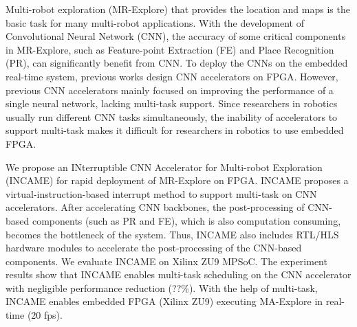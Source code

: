 Multi-robot exploration (MR-Explore) that provides the location and maps is the basic task for many multi-robot applications. 
With the development of Convolutional Neural Network (CNN), the accuracy of some critical components in MR-Explore, such as Feature-point Extraction (FE) and Place Recognition (PR), can significantly benefit from CNN. 
To deploy the CNNs on the embedded real-time system, previous works design CNN accelerators on FPGA. 
However, previous CNN accelerators mainly focused on improving the performance of a single neural network, lacking multi-task support.
Since researchers in robotics usually run different CNN tasks simultaneously, the inability of accelerators to support multi-task makes it difficult for researchers in robotics to use embedded FPGA.

We propose an INterruptible CNN Accelerator for Multi-robot Exploration (INCAME) for rapid deployment of MR-Explore on FPGA.
INCAME proposes a virtual-instruction-based interrupt method to support multi-task on CNN accelerators.
After accelerating  CNN backbones, the post-processing of  CNN-based components (such as PR and FE), which is also computation consuming, becomes the bottleneck of the system.
Thus, INCAME also includes RTL/HLS hardware modules to accelerate the post-processing of the CNN-based components.
We evaluate INCAME on Xilinx ZU9 MPSoC. The experiment results show that INCAME enables multi-task scheduling on the CNN accelerator with negligible performance reduction (??\%). With the help of multi-task, INCAME enables embedded FPGA (Xilinx ZU9) executing MA-Explore in real-time (20 fps).

